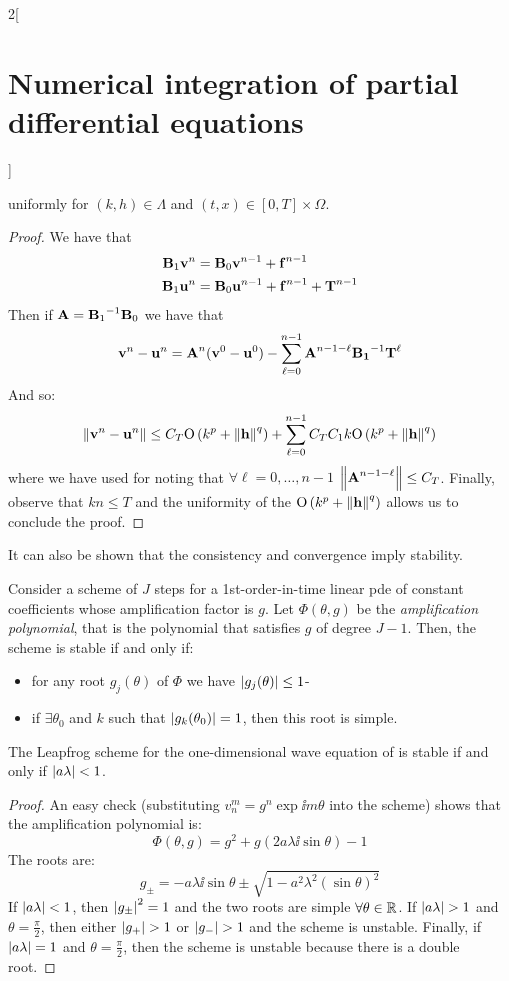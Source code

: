 \documentclass[../../../main_math.tex]{subfiles}
\begin{document}
\begin{multicols}{2}[\section{Numerical integration of partial differential equations}]
\begin{theorem}
$$    $$
    uniformly for $(k,h)\in\Lambda$ and $(t,x)\in[0,T]\times\Omega$.
  \end{theorem}
  \begin{proof}
    We have that
    \begin{align*}
      \boldsymbol{\mathrm{B}}_1\boldsymbol{\mathrm{v}}^{n} & =\boldsymbol{\mathrm{B}}_0\boldsymbol{\mathrm{v}}^{n-1}+\boldsymbol{\mathrm{f}}^{n-1}               \\
      \boldsymbol{\mathrm{B}}_1\boldsymbol{\mathrm{u}}^{n} & =\boldsymbol{\mathrm{B}}_0\boldsymbol{\mathrm{u}}^{n-1} +\boldsymbol{\mathrm{f}}^{n-1}+\boldsymbol{\mathrm{T}}^{n-1}
    \end{align*}
    Then if $\boldsymbol{\mathrm{A}}= {\boldsymbol{\mathrm{B}}_1}^{-1}\boldsymbol{\mathrm{B}}_0$ we have that
    $$\boldsymbol{\mathrm{v}}^n-\boldsymbol{\mathrm{u}}^n=\boldsymbol{\mathrm{A}}^n(\boldsymbol{\mathrm{v}}^0-\boldsymbol{\mathrm{u}}^0)-\sum_{\ell=0}^{n-1}\boldsymbol{\mathrm{A}}^{n-1-\ell}{\boldsymbol{\mathrm{B_1}}}^{-1}\boldsymbol{\mathrm{T}}^\ell$$
    And so:
    $$
      \left\|\boldsymbol{\mathrm{v}}^n-\boldsymbol{\mathrm{u}}^n\right\|\leq C_T \mathrm{O}\left(k^p+\left\|\boldsymbol{\mathrm{h}}\right\|^q\right)+\sum_{\ell=0}^{n-1}C_T C_1k\mathrm{O}\left(k^p+\left\|\boldsymbol{\mathrm{h}}\right\|^q\right)
    $$
    where we have used  for noting that $\forall\ell=0,\ldots,n-1$ $\left\|\boldsymbol{\mathrm{A}}^{n-1-\ell}\right\|\leq C_T$.
    Finally, observe that $kn\leq T$ and the uniformity of the $\mathrm{O}\left(k^p+\left\|\boldsymbol{\mathrm{h}}\right\|^q\right)$ allows us to conclude the proof.
  \end{proof}
  \begin{remark}
    It can also be shown that the consistency and convergence imply stability.
  \end{remark}
  \begin{theorem}
    Consider a scheme of $J$ steps for a 1st-order-in-time linear pde of constant coefficients whose amplification factor is $g$. Let $\Phi(\theta, g)$ be the \emph{amplification polynomial}, that is the polynomial that satisfies $g$ of degree $J-1$. Then, the scheme is stable if and only if:
    \begin{itemize}
      \item for any root $g_j(\theta)$ of $\Phi$ we have $\abs{g_j(\theta)}\leq 1$-
      \item if $\exists \theta_0$ and $k$ such that $\abs{g_k(\theta_0)}=1$, then this root is simple.
    \end{itemize}
  \end{theorem}
  \begin{proposition}
    The Leapfrog scheme for the one-dimensional wave equation of  is stable if and only if $\abs{a\lambda}< 1$.
  \end{proposition}
  \begin{proof}
    An easy check (substituting $v_n^m=g^n \exp{\ii m\theta}$ into the scheme) shows that the amplification polynomial is:
    $$
      \Phi(\theta,g)=g^2+g(2a\lambda\ii\sin\theta)-1
    $$
    The roots are:
    $$
      g_{\pm} = -a\lambda\ii\sin\theta\pm\sqrt{1-a^2\lambda^2{(\sin\theta)}^2}
    $$
    If $\abs{a\lambda}<1$, then $\abs{g_{\pm}}^2=1$ and the two roots are simple $\forall \theta\in\mathbb{R}$. If $\abs{a\lambda}>1$ and $\theta=\frac{\pi}{2}$, then either $\abs{g_+}>1$ or $\abs{g_-}>1$ and the scheme is unstable. Finally, if $\abs{a\lambda}=1$ and $\theta=\frac{\pi}{2}$, then the scheme is unstable because there is a double root.
  \end{proof}

\end{multicols}
\end{document}

